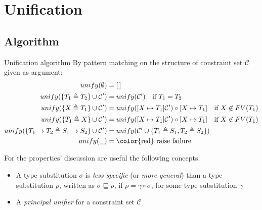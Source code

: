 \documentclass[8pt]{beamer}
\begin{document}
\section{Unification}
\subsection{Algorithm}
\begin{frame}
    \begin{block}{Unification algorithm}
        By pattern matching on the structure of constraint set $\mathcal{C}$
        given as argument:
        \begin{displaymath}
            \begin{split}
                unify(\emptyset) &= [\,] \\
                unify(\{T_1 \triangleq T_2\} \cup \mathcal{C}^{\prime}) &=
                    unify(\mathcal{C}^{\prime})
                    \quad \text{if } T_1 = T_2\\
                unify(\{X \triangleq T_1\} \cup \mathcal{C}^{\prime}) &=
                    unify([ X \mapsto T_1]\mathcal{C}^{\prime}) \circ [X \mapsto T_1]
                    \quad \text{if } X \not \in FV(T_1)\\
                unify(\{T_1 \triangleq X\} \cup \mathcal{C}^{\prime}) &=
                    unify([ X \mapsto T_1]\mathcal{C}^{\prime}) \circ [X \mapsto T_1]
                    \quad \text{if } X \not \in FV(T_1)\\
                unify(\{T_1 \rightarrow T_2 \triangleq S_1\rightarrow S_2 \} 
                    \cup \mathcal{C}^{\prime}) &=
                    unify(\mathcal{C}^{\prime} \cup \{T_1 \triangleq S_1,
                        T_2 \triangleq S_2\}) \\
                unify(\_) &= \text{\color{red} raise failure}\\
            \end{split}
        \end{displaymath}
    \end{block}
    \pause
    For the properties' discussion are useful the following concepts:
    \begin{itemize}
        \item   A type substitution $\sigma$ is \emph{less specific} (or 
                \emph{more general}) than a type substitution $\rho$, written
                as $\sigma \sqsubseteq \rho$, if $\rho = \gamma \circ \sigma$,
                for some type substitution $\gamma$
        \item   A \emph{principal unifier} for a constraint set $\mathcal{C}$ 

\end{itemize}
\end{frame}
\end{document}
